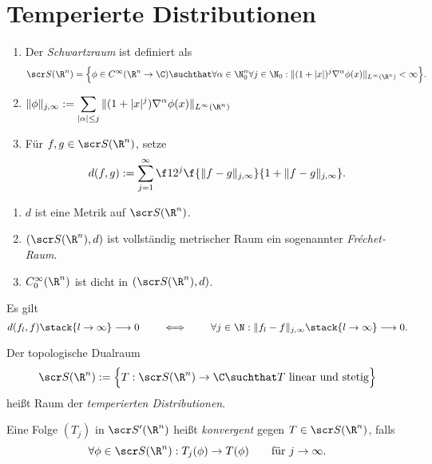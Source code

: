 \section{Temperierte Distributionen}

\begin{df} \label{5.46}
	\begin{enumerate}[1)]
		\item
			Der \emph{Schwartzraum} ist definiert als
			\[
				\scr S(\R^n)
				= \Big\{ \phi \in C^\infty(\R^n \to \C) \suchthat
							\forall \alpha \in \N_0^n \forall j \in \N_0
									: \|(1+|x|)^j \nabla^\alpha \phi(x) \|_{L^\infty(\R^n)} < \infty
					\Big\}.
			\]
		\item
			$\displaystyle \|\phi\|_{j,\infty} := \sum_{|\alpha| \le j} \|(1+|x|^j) \nabla^\alpha \phi(x) \|_{L^\infty(\R^n)}$
		\item
			Für $f,g \in \scr S (\R^n)$, setze
			\[
				d(f,g) := \sum_{j=1}^\infty \f 1{2^j} \f {\|f-g\|_{j,\infty}}{1+\|f-g\|_{j,\infty}}.
			\]
	\end{enumerate}
\end{df}

\begin{st} \label{5.47}
	\begin{enumerate}[1)]
		\item
			$d$ ist eine Metrik auf $\scr S(\R^n)$.
		\item
			$(\scr S(\R^n), d)$ ist vollständig metrischer Raum ein sogenannter \emph{Fréchet-Raum}.
		\item
			$C_0^\infty(\R^n)$ ist dicht in $(\scr S(\R^n), d)$.
	\end{enumerate}
\end{st}

\begin{nt} \label{5.48}
	Es gilt
	\[
		d(f_l, f) \stack{l\to\infty}\longrightarrow 0
		\qquad\iff\qquad
		\forall j\in \N : \|f_l - f\|_{j,\infty} \stack{l\to\infty}\longrightarrow 0.
	\]
\end{nt}

\begin{df} \label{5.49}
	Der topologische Dualraum
	\[
		\scr S(\R^n)
		:= \Big\{ T : \scr S(\R^n) \to \C \suchthat T \text{ linear und stetig} \Big\}
	\]
	heißt Raum der \emph{temperierten Distributionen}.

	Eine Folge $(T_j)$ in $\scr S'(\R^n)$ heißt \emph{konvergent} gegen $T \in \scr S(\R^n)$, falls
	\[
		\forall \phi \in \scr S(\R^n) : T_j(\phi) \to T(\phi)
		\qquad \text{für $j\to \infty$.}
	\]
\end{df}

